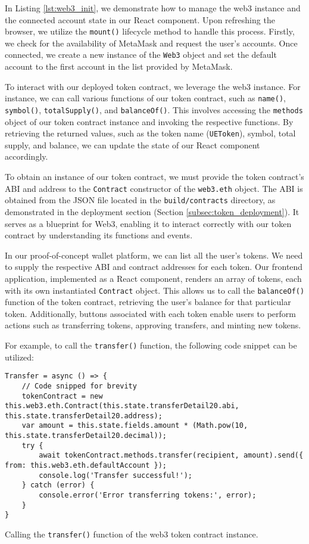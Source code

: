 In Listing \ref{lst:web3_init}, we demonstrate how to manage the web3 instance and the connected account state in our React component. Upon
refreshing the browser, we utilize the \texttt{mount()} lifecycle method to handle this process. Firstly, we check for the availability
of MetaMask and request the user's accounts. Once connected, we create a new instance of the \texttt{Web3} object and set the default account to the first account in the list provided by MetaMask.


To interact with our deployed token contract, we leverage the web3 instance. For instance, we can call various functions of our token contract, such as
\texttt{name()}, \texttt{symbol()}, \texttt{totalSupply()}, and \texttt{balanceOf()}. This involves accessing the \texttt{methods} object of our
token contract instance and invoking the respective functions. By retrieving the returned values, such as the token name (\texttt{UEToken}), symbol,
total supply, and balance, we can update the state of our React component accordingly.


To obtain an instance of our token contract, we must provide the token contract's ABI and address to the \texttt{Contract} constructor of the
\texttt{web3.eth} object. The ABI is obtained from the JSON file located in the \texttt{build/contracts} directory, as demonstrated in the
deployment section (Section \ref{subsec:token_deployment}). It serves as a blueprint for Web3, enabling it to interact correctly with our token
contract by understanding its functions and events.




In our proof-of-concept wallet platform, we can list all the user's tokens. We need to supply the respective ABI and
contract addresses for each token. Our frontend application, implemented as a React component, renders an array of tokens, each with its own
instantiated \texttt{Contract} object. This allows us to call the \texttt{balanceOf()} function of the token contract, retrieving the user's
balance for that particular token. Additionally, buttons associated with each token enable users to perform actions such as transferring tokens,
approving transfers, and minting new tokens.


For example, to call the \texttt{transfer()} function, the following code snippet can be utilized:


\begin{listing}[H]
    \begin{verbatim}
Transfer = async () => {
    // Code snipped for brevity
    tokenContract = new this.web3.eth.Contract(this.state.transferDetail20.abi, this.state.transferDetail20.address);
    var amount = this.state.fields.amount * (Math.pow(10, this.state.transferDetail20.decimal));
    try {
        await tokenContract.methods.transfer(recipient, amount).send({ from: this.web3.eth.defaultAccount });
        console.log('Transfer successful!');
    } catch (error) {
        console.error('Error transferring tokens:', error);
    }
}
    \end{verbatim}
    \caption{Calling the \texttt{transfer()} function of the web3 token contract instance.}
    \label{lst:transfer}
\end{listing}


